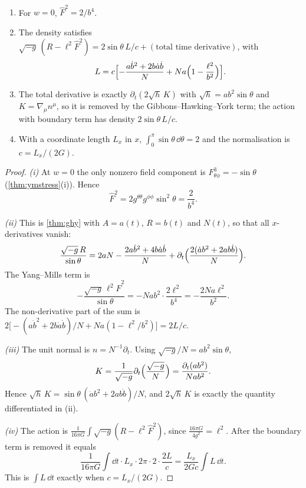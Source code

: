 \begin{theorem}\label{thm:ksaction}\ver\
\begin{enumerate}[label=(\roman*)]
\item For $w=0$, $\hat F^2=2/b^4$.
\item The density satisfies $\sqrt{-g}\,(R-\ell^2\hat F^2)=2\sin\theta\,L/c+(\text{total time derivative})$, with
\[
L=c\Bigl[-\frac{a\dot b^2+2b\dot a\dot b}{N}+Na\Bigl(1-\frac{\ell^2}{b^2}\Bigr)\Bigr].
\]
\item The total derivative is exactly $\partial_t(2\sqrt h\,K)$ with $\sqrt h=ab^2\sin\theta$ and $K=\nabla_\mu n^\mu$, so it is removed by the Gibbons--Hawking--York term; the action with boundary term has density $2\sin\theta\,L/c$.
\item With a coordinate length $L_x$ in $x$, $\int_0^\pi\sin\theta\,\dd\theta=2$ and the normalisation is $c=L_x/(2G)$.
\end{enumerate}
\end{theorem}
\begin{proof}
\emph{(i)} At $w=0$ the only nonzero field component is $F^3_{\theta\phi}=-\sin\theta$ (\cref{thm:ymstress}(i)). Hence
\[
\hat F^2=2g^{\theta\theta}g^{\phi\phi}\sin^2\theta=\frac2{b^4}.
\]

\emph{(ii)} This is \cref{thm:ghy} with $A=a(t)$, $R=b(t)$ and $N(t)$, so that all $x$-derivatives vanish:
\[
\frac{\sqrt{-g}\,R}{\sin\theta}=2aN-\frac{2a\dot b^2+4b\dot a\dot b}N+\partial_t\Bigl(\frac{2(\dot ab^2+2ab\dot b)}N\Bigr).
\]
The Yang--Mills term is
\[
-\frac{\sqrt{-g}\,\ell^2\hat F^2}{\sin\theta}=-Nab^2\cdot\frac{2\ell^2}{b^4}=-\frac{2Na\ell^2}{b^2}.
\]
The non-derivative part of the sum is $2\bigl[-(a\dot b^2+2b\dot a\dot b)/N+Na(1-\ell^2/b^2)\bigr]=2L/c$.

\emph{(iii)} The unit normal is $n=N^{-1}\partial_t$. Using $\sqrt{-g}/N=ab^2\sin\theta$,
\[
K=\frac1{\sqrt{-g}}\partial_t\Bigl(\frac{\sqrt{-g}}N\Bigr)=\frac{\partial_t(ab^2)}{Nab^2}.
\]
Hence $\sqrt h\,K=\sin\theta\,(\dot ab^2+2ab\dot b)/N$, and $2\sqrt h\,K$ is exactly the quantity differentiated in (ii).

\emph{(iv)} The action is $\frac1{16\pi G}\int\sqrt{-g}(R-\ell^2\hat F^2)$, since $\frac{16\pi G}{4g^2}=\ell^2$. After the boundary term is removed it equals
\[
\frac1{16\pi G}\int\dd t\cdot L_x\cdot2\pi\cdot2\cdot\frac{2L}c=\frac{L_x}{2Gc}\int L\,\dd t .
\]
This is $\int L\,\dd t$ exactly when $c=L_x/(2G)$.
\end{proof}


